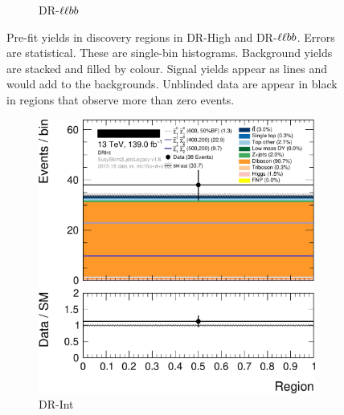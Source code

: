 \begin{figure}[tp]
\begin{subfigure}{0.495\textwidth}
\caption{DR-$\llbb$}
\end{subfigure}
\caption[
Pre-fit yields in discovery regions in DR-High and DR-$\llbb$
]{%
Pre-fit yields in discovery regions in DR-High and DR-$\llbb$.
Errors are statistical.
These are single-bin histograms.
Background yields are stacked and filled by colour.
Signal yields appear as lines and would add to the backgrounds.
Unblinded data are appear in black in regions that observe more than zero
events.%
}
\label{fig:2ljets_disco_prefit_higher}
\end{figure}


\begin{figure}[tp]
\centering
\begin{subfigure}{0.495\textwidth}
\centering
\includegraphics[width=\textwidth]{figures/2ljets_disco_plot_DRInt.png}
\caption{DR-Int}
\end{subfigure}
\hfill
\begin{subfigure}{0.495\textwidth}
\centering

\end{subfigure}
\end{figure}
